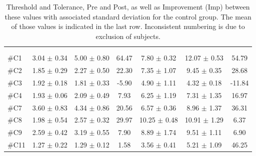 \begin{longtable} {l|c|c|c|c|c|c}
\caption{Threshold and Tolerance, Pre and Post, as well as Improvement (Imp) between these values with associated standard deviation for the control group. The mean of those values is indicated in the last row. Inconsistent numbering is due to exclusion of subjects.}
	\label{tab:Control} \\
\cellcolor[HTML]{C0C0C0} {} & 
\multicolumn{3}{c|}{ \cellcolor[HTML]{C0C0C0}{\textbf{Threshold}}} & \multicolumn{3}{c}{ \cellcolor[HTML]{C0C0C0}{\textbf{Tolerance}}}  	\\  \rule{0pt}{3ex} 
  \cellcolor[HTML]{C0C0C0}{} &
 \multicolumn{1}{c|}{ \cellcolor[HTML]{C0C0C0}{Pre [kgF]}} & \multicolumn{1}{c|}{ \cellcolor[HTML]{C0C0C0}{Post [kgF]}} & \multicolumn{1}{c|}{ \cellcolor[HTML]{C0C0C0}{Imp [\%]}} 
 & \multicolumn{1}{|c|}{ \cellcolor[HTML]{C0C0C0}{Pre [kgF]}} 
 & \multicolumn{1}{c|}{ \cellcolor[HTML]{C0C0C0}{Post [kgF]}} & \multicolumn{1}{c|}{ \cellcolor[HTML]{C0C0C0}{Imp[\%]}} \\ \hline  
\#C1 & 3.04 $\pm$ 0.34	& 5.00 $\pm$ 0.80 & 64.47	& 7.80 $\pm$	 0.32 & 12.07 $\pm$ 0.53 & 54.79 \\ \hline
\#C2 & 1.85 $\pm$ 0.29 	& 2.27 $\pm$ 0.50 & 22.30	& 7.35 $\pm$ 1.07	& 9.45 $\pm$ 0.35 & 28.68	\\ \hline
\#C3 & 1.92 $\pm$ 0.18 & 1.81 $\pm$ 0.33 &-5.90 & 4.90 $\pm$ 1.11 	& 	4.32 $\pm$ 0.18 & -11.84	\\ \hline
\#C4 & 1.93 $\pm$ 0.06 & 2.09 $\pm$ 0.49 & 7.93	& 6.25 $\pm$ 1.19	&7.31 $\pm$ 	1.35  & 16.97 \\ \hline
\#C7 & 3.60 $\pm$ 0.83  & 4.34 $\pm$	0.86 & 20.56	& 6.57 $\pm$ 0.36 & 8.96 $\pm$ 1.37 & 36.31 \\ \hline
\#C8 & 1.98 $\pm$ 0.54 & 2.57 $\pm$ 0.32 & 29.97	& 10.25 $\pm$ 0.48	& 10.91 $\pm$  1.29 & 6.37 \\ \hline
\#C9 & 2.59 $\pm$ 0.42 & 3.19 $\pm$ 0.55 & 7.90 & 8.89 $\pm$ 1.74	& 9.51 $\pm$  1.11 & 6.90 \\ \hline
\#C11 & 1.27 $\pm$ 0.22 & 1.29 	$\pm$ 0.12 & 1.58 	& 3.56 $\pm$ 0.41 & 5.21 $\pm$ 1.09 & 46.25 \\ \hline

\end{longtable}
